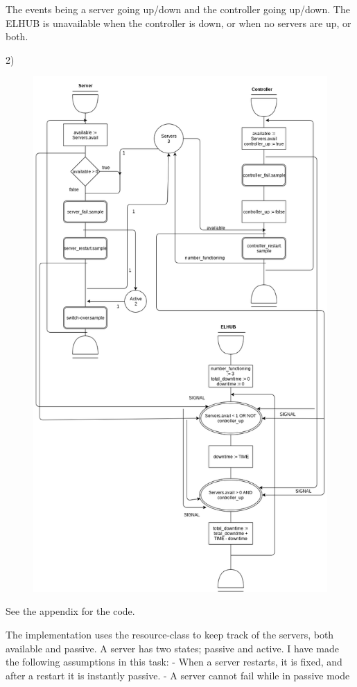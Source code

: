 \documentclass[11pt]{article}
\begin{document}
The events being a server going up/down and the controller going up/down.
The ELHUB is unavailable when the controller is down, or when no servers are up, or both.

2) 
\begin{figure}[H]
	\includegraphics[width=\textwidth]{activity_diagram2.png}
	\centering
\end{figure}

See the appendix for the code.

The implementation uses the resource-class to keep track of the servers, both available and passive. A server has two states; passive and active. I have made the following assumptions in this task:
- When a server restarts, it is fixed, and after a restart it is instantly passive.
- A server cannot fail while in passive mode
\end{document}
